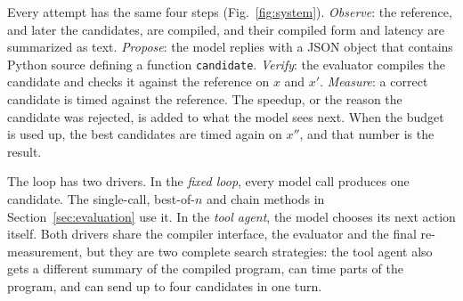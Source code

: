 \documentclass[conference]{IEEEtran}
\begin{document}
Every attempt has the same four steps (Fig.~\ref{fig:system}).
\emph{Observe}: the reference, and later the candidates, are compiled, and
their compiled form and latency are summarized as text. \emph{Propose}: the
model replies with a JSON object that contains Python source defining a
function \texttt{candidate}. \emph{Verify}: the evaluator compiles the
candidate and checks it against the reference on $x$ and $x'$.
\emph{Measure}: a correct candidate is timed against the reference. The
speedup, or the reason the candidate was rejected, is added to what the
model sees next. When the budget is used up, the best candidates are timed
again on $x''$, and that number is the result.

The loop has two drivers. In the \emph{fixed loop}, every model call
produces one candidate. The single-call, best-of-$n$ and chain methods in
Section~\ref{sec:evaluation} use it. In the \emph{tool agent}, the model
chooses its next action itself. Both drivers share the compiler interface,
the evaluator and the final re-measurement, but they are two complete search
strategies: the tool agent also gets a different summary of the compiled
program, can time parts of the program, and can send up to four candidates
in one turn.
\end{document}
